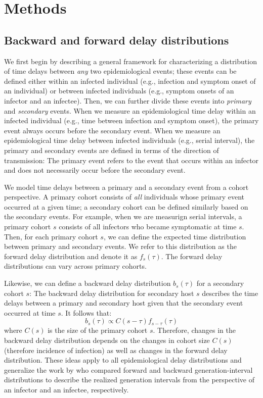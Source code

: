 \documentclass[12pt]{article}
\begin{document}
\section{Methods}

\subsection{Backward and forward delay distributions}

We first begin by describing a general framework for characterizing a distribution of time delays between \emph{any} two epidemiological events;
these events can be defined either within an infected individual (e.g., infection and symptom onset of an individual) or between infected individuals (e.g., symptom onsets of an infector and an infectee).
Then, we can further divide these events into \emph{primary} and \emph{secondary} events.
When we measure an epidemiological time delay within an infected individual (e.g., time between infection and symptom onset), the primary event always occurs before the secondary event.
When we measure an epidemiological time delay between infected individuals (e.g., serial interval), 
the primary and secondary events are defined in terms of the direction of transmission:
The primary event refers to the event that occurs within an infector and does not necessarily occur before the secondary event.

We model time delays between a primary and a secondary event from a cohort perspective.
A primary cohort consists of \emph{all} individuals whose primary event occurred at a given time; 
a secondary cohort can be defined similarly based on the secondary events.
For example, when we are measurign serial intervals, a primary cohort $s$ consists of all infectors who became symptomatic at time $s$.
Then, for each primary cohort $s$, we can define the expected time distribution between primary and secondary events.
We refer to this distribution as the forward delay distribution and denote it as $f_s(\tau)$.
The forward delay distributions can vary across primary cohorts.

Likewise, we can define a backward delay distribution $b_s(\tau)$ for a secondary cohort $s$:
The backward delay distribution for secondary host $s$ describes the time delays between a primary and secondary host given that the secondary event occurred at time $s$.
It follows that:
\begin{equation}
b_s(\tau) \propto C(s-\tau) f_{s-\tau}(\tau)
\end{equation}
where $C(s)$ is the size of the primary cohort $s$.
Therefore, changes in the backward delay distribution depends on the changes in cohort size $C(s)$ (therefore incidence of infection) as well as changes in the forward delay distribution.
These ideas apply to all epidemiological delay distributions and generalize the work by \citep{champredon2015intrinsic} who compared forward and backward generation-interval distributions to describe the realized generation intervals from the perspective of an infector and an infectee, respectively.
\end{document}
